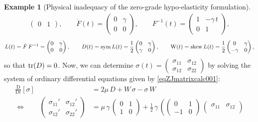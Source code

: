 \documentclass[10pt]{article}
\newcounter{theoremCounter}
\numberwithin{theoremCounter}{section}
\theoremstyle{plain}
\theoremstyle{definition}
\newtheorem{example}[theoremCounter]{Example}
\newcommand{\DD}{\mathrm{D}}
\newcommand{\WW}{\mathrm{W}}
\DeclareMathOperator{\sym}{sym}
\DeclareMathOperator{\tr}{tr}
\def\tr{\textnormal{tr}}
\numberwithin{equation}{section}
\begin{document}
\begin{appendix}
\begin{example}[Physical inadequacy of the zero-grade hypo-elasticity formulation]
\begin{align*}
\begin{pmatrix}
	0 & 1
	\end{pmatrix},
	\qquad
	\dot{F}(t) =
	\begin{pmatrix}
	0 & \gamma \\
	0 & 0
	\end{pmatrix},
	\qquad
	F^{-1}(t) =
	\begin{pmatrix}
	1 & -\gamma \, t \\
	0 & 1
	\end{pmatrix},
	\end{align*}
%
	\begin{align*}
	L(t) = \dot{F} \, F^{-1} =
	\begin{pmatrix}
	0 & \gamma \\
	0 & 0
	\end{pmatrix},
	\qquad
	D(t) = \sym L(t) = \frac12
	\begin{pmatrix}
	0 & \gamma \\
	\gamma & 0
	\end{pmatrix},
	\qquad
	\WW(t) = \textnormal{skew} \, L(t) = \frac12
	\begin{pmatrix}
	0 & \gamma \\
	-\gamma & 0
	\end{pmatrix},
	\end{align*}
so that $\tr(D) = 0$. Now, we can determine $\sigma(t) = \begin{pmatrix} \sigma_{11} & \sigma_{12} \\ \sigma_{12} & \sigma_{22} \end{pmatrix}$ by solving the system of ordinary differential equations given by \eqref{eqZJmatrixcalc001}:
	\begin{equation}
	\begin{alignedat}{2}
	\frac{\DD}{\DD t}[\sigma] &= 2 \mu \, D + W \, \sigma - \sigma \, W \\
	\iff \qquad
	\begin{pmatrix}
	\sigma_{11}' & \sigma_{12}' \\
	\sigma_{12}' & \sigma_{22}'
	\end{pmatrix}
	&= \mu \, \gamma \,
	\begin{pmatrix}
	0 & 1 \\
	1 & 0
	\end{pmatrix}
	+ \frac12 \, \gamma \, \left(
	\begin{pmatrix}
	0 & 1 \\
	-1 & 0
	\end{pmatrix} \,
	\begin{pmatrix}
	\sigma_{11} & \sigma_{12} \\

\end{pmatrix}
\end{alignedat}
\end{equation}
\end{example}
\end{appendix}
\end{document}
